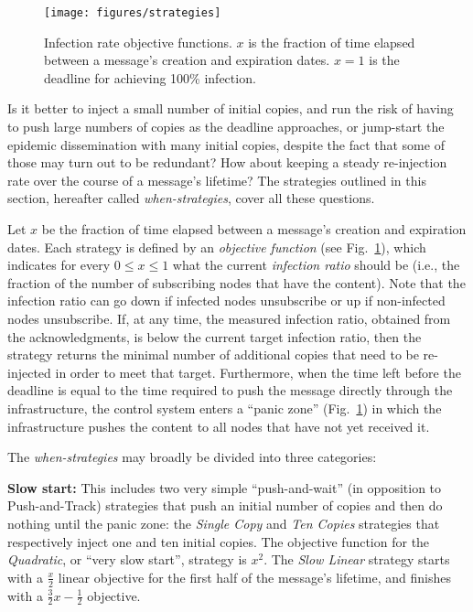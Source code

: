 \documentclass[preprint]{elsarticle}
\begin{document}
\begin{figure}
  \centering
  \texttt{[image: figures/strategies]}
  \caption{Infection rate objective functions. $x$ is the fraction of time elapsed between a message's creation and expiration dates. $x=1$ is the deadline for achieving 100\% infection.}
  \label{fig:objective_functions}
\end{figure}

Is it better to inject a small number of initial copies, and run the risk of having to push large numbers of copies as the deadline approaches, or jump-start the epidemic dissemination with many initial copies, despite the fact that some of those may turn out to be redundant? How about keeping a steady re-injection rate over the course of a message's lifetime? The strategies outlined in this section, hereafter called \textit{when-strategies}, cover all these questions.

Let $x$ be the fraction of time elapsed between a message's creation and expiration dates. Each strategy is defined by an \textit{objective function} (see Fig.~\ref{fig:objective_functions}), which indicates for every $0 \le x \le 1 $ what the current \textit{infection ratio} should be (i.e., the fraction of the number of subscribing nodes that have the content). Note that the infection ratio can go down if infected nodes unsubscribe or up if non-infected nodes unsubscribe. If, at any time, the measured infection ratio, obtained from the acknowledgments, is below the current target infection ratio, then the strategy returns the minimal number of additional copies that need to be re-injected in order to meet that target. Furthermore, when the time left before the deadline is equal to the time required to push the message directly through the infrastructure, the control system enters a ``panic zone'' (Fig.~\ref{fig:objective_functions}) in which the infrastructure pushes the content to all nodes that have not yet received it.

The \textit{when-strategies} may broadly be divided into three categories:

\smallskip\noindent\textbf{Slow start:} This includes two very simple ``push-and-wait'' (in opposition to Push-and-Track) strategies that push an initial number of copies and then do nothing until the panic zone: the \textit{Single Copy} and \textit{Ten Copies} strategies that respectively inject one and ten initial copies. The objective function for the \textit{Quadratic}, or ``very slow start'', strategy is $x^2$. The \textit{Slow Linear} strategy starts with a $\frac{x}{2}$ linear objective for the first half of the message's lifetime, and finishes with a $\frac{3}{2}x-\frac{1}{2}$ objective.
\end{document}
